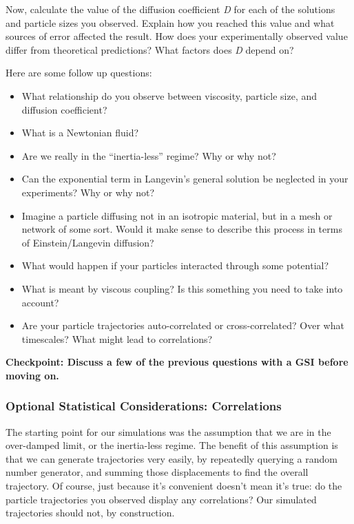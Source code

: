 \documentclass{../lab}
\begin{document}
Now, calculate the value of the diffusion coefficient \emph{D} for each of the solutions and particle sizes you observed. Explain how you reached this value and what sources of error affected the result. How does your experimentally observed value differ from theoretical predictions? What factors does \emph{D} depend on?

Here are some follow up questions:

\begin{itemize}
    \item What relationship do you observe between viscosity, particle size, and diffusion coefficient?

    \item What is a Newtonian fluid?

    \item Are we really in the ``inertia-less'' regime? Why or why not?

    \item Can the exponential term in Langevin's general solution be neglected in your experiments? Why or why not?

    \item Imagine a particle diffusing not in an isotropic material, but in a mesh or network of some sort. Would it make sense to describe this process in terms of Einstein/Langevin diffusion?

    \item What would happen if your particles interacted through some potential?

    \item What is meant by viscous coupling? Is this something you need to take into account?

    \item Are your particle trajectories auto-correlated or cross-correlated? Over what timescales? What might lead to correlations?
\end{itemize}

\textbf{Checkpoint: Discuss a few of the previous questions with a GSI before moving on.}

\subsubsection{Optional Statistical Considerations: Correlations}

The starting point for our simulations was the assumption that we are in the over-damped limit, or the inertia-less regime. The benefit of this assumption is that we can generate trajectories very easily, by repeatedly querying a random number generator, and summing those displacements to find the overall trajectory. Of course, just because it's convenient doesn't mean it's true: do the particle trajectories you observed display any correlations? Our simulated trajectories should not, by construction.
\end{document}
